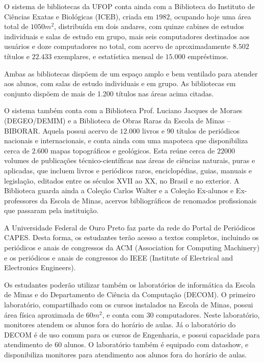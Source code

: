 O sistema de bibliotecas da UFOP conta ainda com a Biblioteca do Instituto de Ciências Exatas e Biológicas (ICEB), criada em $1982$, ocupando hoje uma área total de $1050 m^{2}$, distribuída em dois andares, com quinze cabines de estudos individuais e salas de estudo em grupo, mais seis computadores destinados aos usuários e doze computadores no total, com acervo de aproximadamente $8.502$ títulos e $22.433$ exemplares, e estatística mensal de $15.000$ empréstimos.

Ambas as bibliotecas dispõem de um espaço amplo e bem ventilado para atender aos alunos, com salas de estudo individuais e em grupo. As bibliotecas em conjunto dispõem de mais de 1.200 títulos nas áreas acima citadas.

O sistema também conta com a Biblioteca Prof. Luciano Jacques de Moraes (DEGEO/DEMIM) e a Biblioteca de Obras Raras da Escola de Minas – BIBORAR. Aquela possui acervo de $12.000$ livros e $90$ títulos de periódicos nacionais e internacionais, e conta ainda com uma mapoteca que disponibiliza cerca de $2.600$ mapas topográficos e geológicos. Esta reúne cerca de $22000$ volumes de publicações técnico-científicas nas áreas de ciências naturais, puras e aplicadas, que incluem livros e periódicos raros, enciclopédias, guias, manuais e legislação, editados entre os séculos XVII ao XX, no Brasil e no exterior. A Biblioteca guarda ainda a Coleção Carlos Walter e a Coleção Ex-alunos e Ex-professores da Escola de Minas, acervos bibliográficos de renomados profissionais que passaram pela instituição.

A Universidade Federal de Ouro Preto faz parte da rede do Portal de Periódicos CAPES. Desta forma, os estudantes terão acesso a textos completos, incluindo os periódicos e anais de congressos da ACM (Association for Computing Machinery) e os periódicos e anais de congressos do IEEE (Institute of Electrical and Electronics Engineers).

Os estudantes poderão utilizar também os laboratórios de informática da Escola de Minas e do Departamento de Ciência da Computação (DECOM). O primeiro laboratório, compartilhado com os cursos instalados na Escola de Minas, possui área física aproximada de $60m^{2}$, e conta com $30$ computadores. Neste laboratório, monitores atendem os alunos fora do horário de aulas. Já o laboratório do DECOM é de uso comum para os cursos de Engenharia, e possui capacidade para atendimento de $60$ alunos. O laboratório também é equipado com datashow, e disponibiliza monitores para atendimento aos alunos fora do horário de aulas.

